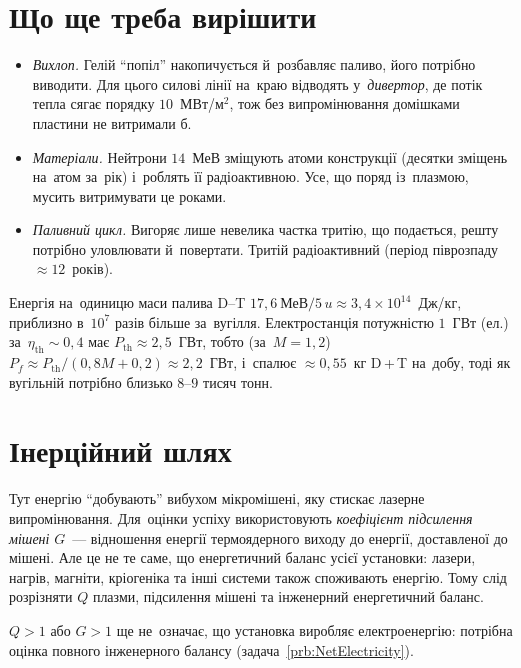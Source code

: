 \section{Що ще треба вирішити}

\begin{itemize}
	\item \emph{Вихлоп.} Гелій \enquote{попіл} накопичується й~розбавляє паливо, його
	  потрібно виводити. Для цього силові лінії на~краю відводять у~\emph{дивертор}, де
	  потік тепла сягає порядку $10$~МВт/м$^2$, тож без випромінювання домішками пластини
	  не витримали б.
	\item \emph{Матеріали.} Нейтрони $14$~МеВ зміщують атоми конструкції (десятки зміщень
	  на~атом за~рік) і~роблять її радіоактивною. Усе, що поряд із~плазмою, мусить
	  витримувати це роками.
	\item \emph{Паливний цикл.} Вигоряє лише невелика частка тритію, що подається, решту
	  потрібно уловлювати й~повертати. Тритій радіоактивний (період піврозпаду
	  $\approx12$~років).
\end{itemize}

\begin{Estimate}
Енергія на~одиницю маси палива D--T
$17{,}6~\text{МеВ}/5\,u\approx3{,}4\times10^{14}$~Дж/кг, приблизно в~$10^{7}$ разів більше
за~вугілля. Електростанція потужністю $1$~ГВт (ел.) за~$\eta_{\mathrm{th}}\sim0{,}4$ має
$P_{\mathrm{th}}\approx2{,}5$~ГВт, тобто (за~$M=1{,}2$) $P_f\approx P_{\mathrm{th}}/(0{,}8M+0{,}2)\approx2{,}2$~ГВт, і~спалює $\approx0{,}55$~кг D\,+\,T на~добу, тоді як вугільній
потрібно близько $8$--$9$ тисяч тонн.
\end{Estimate}

\section{Інерційний шлях}

Тут енергію \enquote{добувають} вибухом мікромішені, яку стискає лазерне випромінювання.
Для~оцінки успіху використовують \emph{коефіцієнт підсилення мішені} $G$~--- відношення енергії
термоядерного виходу до енергії, доставленої до мішені. Але це не те саме, що енергетичний
баланс усієї установки: лазери, нагрів, магніти, кріогеніка та інші системи також
споживають енергію. Тому слід розрізняти $Q$ плазми, підсилення мішені та інженерний
енергетичний баланс.

\begin{Attention}
	$Q>1$ або $G>1$ ще не~означає, що установка виробляє електроенергію: потрібна оцінка повного інженерного балансу (задача~\ref{prb:NetElectricity}).
\end{Attention}

